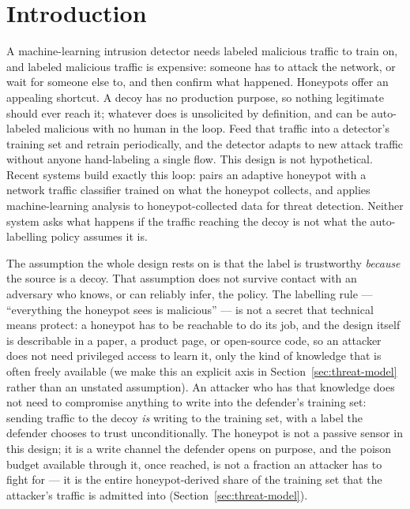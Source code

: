 \section{Introduction}
\label{sec:introduction}

A machine-learning intrusion detector needs labeled malicious traffic to train on, and labeled
malicious traffic is expensive: someone has to attack the network, or wait for someone else to,
and then confirm what happened. Honeypots offer an appealing shortcut. A decoy has no production
purpose, so nothing legitimate should ever reach it; whatever does is unsolicited by definition,
and can be auto-labeled malicious with no human in the loop. Feed that traffic into a detector's
training set and retrain periodically, and the detector adapts to new attack traffic without
anyone hand-labeling a single flow. This design is not hypothetical. Recent systems build
exactly this loop: \citet{matcheswala2024creating} pairs an adaptive honeypot with a network
traffic classifier trained on what the honeypot collects, and \citet{lanka2024intelligent}
applies machine-learning analysis to honeypot-collected data for threat detection. Neither
system asks what happens if the traffic reaching the decoy is not what the auto-labelling policy
assumes it is.

The assumption the whole design rests on is that the label is trustworthy \emph{because} the
source is a decoy. That assumption does not survive contact with an adversary who knows, or can
reliably infer, the policy. The labelling rule — “everything the honeypot sees is malicious” — is
not a secret that technical means protect: a honeypot has to be reachable to do its job, and the
design itself is describable in a paper, a product page, or open-source code, so an attacker does
not need privileged access to learn it, only the kind of knowledge that is often freely available
(we make this an explicit axis in Section~\ref{sec:threat-model} rather than an unstated
assumption). An attacker who has that knowledge does not need to compromise anything to write
into the defender's training set: sending traffic to the decoy \emph{is} writing to the training
set, with a label the defender chooses to trust unconditionally. The honeypot is not a passive
sensor in this design; it is a write channel the defender opens on purpose, and the poison budget
available through it, once reached, is not a fraction an attacker has to fight for — it is the
entire honeypot-derived share of the training set that the attacker's traffic is admitted into
(Section~\ref{sec:threat-model}).

